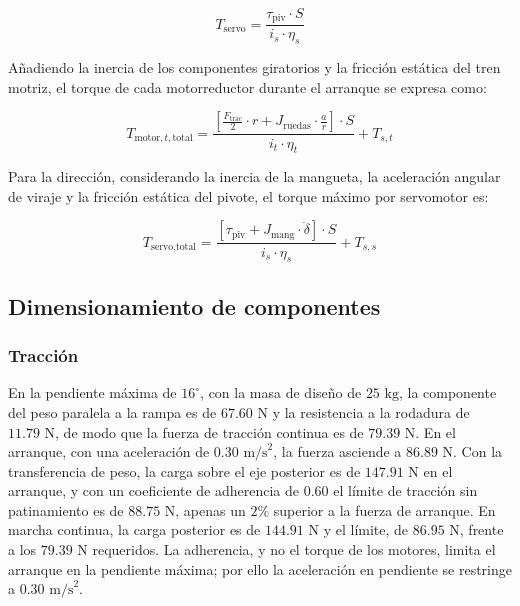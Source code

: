 \documentclass[../../General.tex]{subfiles}
\begin{document}
\begin{equation*}
    T_{\text{servo}} = \frac{\tau_{\text{piv}} \cdot S}{i_s \cdot \eta_s}
\end{equation*}

Añadiendo la inercia de los componentes giratorios y la fricción estática del tren motriz, el torque de cada motorreductor durante el arranque se expresa como:

\begin{equation*}
    T_{\text{motor},t,\text{total}} = \frac{\left[ \frac{F_{\text{trac}}}{2} \cdot r + J_{\text{ruedas}} \cdot \frac{a}{r} \right] \cdot S}{i_t \cdot \eta_t} + T_{s,t}
\end{equation*}

Para la dirección, considerando la inercia de la mangueta, la aceleración angular de viraje y la fricción estática del pivote, el torque máximo por servomotor es:

\begin{equation*}
    T_{\text{servo},\text{total}} = \frac{\left[ \tau_{\text{piv}} + J_{\text{mang}} \cdot \ddot{\delta} \right] \cdot S}{i_s \cdot \eta_s} + T_{s,s}
\end{equation*}

\subsection{Dimensionamiento de componentes}

\subsubsection{Tracción}

En la pendiente máxima de $16^\circ$, con la masa de diseño de $25\text{ kg}$, la componente del peso paralela a la rampa es de $67.60\text{ N}$ y la resistencia a la rodadura de $11.79\text{ N}$, de modo que la fuerza de tracción continua es de $79.39\text{ N}$. En el arranque, con una aceleración de $0.30\text{ m/s}^2$, la fuerza asciende a $86.89\text{ N}$. Con la transferencia de peso, la carga sobre el eje posterior es de $147.91\text{ N}$ en el arranque, y con un coeficiente de adherencia de $0.60$ el límite de tracción sin patinamiento es de $88.75\text{ N}$, apenas un $2\%$ superior a la fuerza de arranque. En marcha continua, la carga posterior es de $144.91\text{ N}$ y el límite, de $86.95\text{ N}$, frente a los $79.39\text{ N}$ requeridos. La adherencia, y no el torque de los motores, limita el arranque en la pendiente máxima; por ello la aceleración en pendiente se restringe a $0.30\text{ m/s}^2$.
\end{document}
